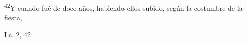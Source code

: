 \documentclass[../../rosario.tex]{subfiles}
\begin{document}
    \textsuperscript{42}Y cuando fué de doce años, habiendo ellos subido, según la costumbre de la fiesta,
    \begin{flushright}
    Lc. 2, 42     
    \end{flushright}
\end{document}
